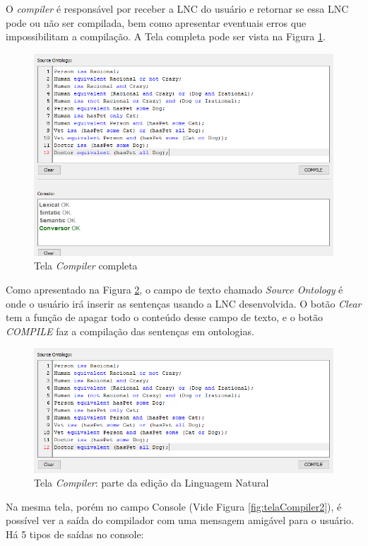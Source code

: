 \documentclass{bcc}
\begin{document}
O \textit{compiler} é responsável por receber a LNC do usuário e retornar se essa LNC pode ou não ser compilada, bem como apresentar eventuais erros que impossibilitam a compilação. A Tela completa pode ser vista na Figura \ref{fig:telaCompiler}.


\begin{figure}[H]
\centering
\includegraphics[width=.8\textwidth]{Figuras/tela_compiler.png}
\caption{Tela \textit{Compiler} completa}
\label{fig:telaCompiler}
\end{figure}

Como apresentado na Figura \ref{fig:telaCompiler1}, o campo de texto chamado \textit{Source Ontology} é onde o usuário irá inserir as sentenças usando a LNC desenvolvida. O botão \textit{Clear} tem a função de apagar todo o conteúdo desse campo de texto, e o botão \textit{COMPILE} faz a compilação das sentenças em ontologias.

\begin{figure}[H]
\centering
\includegraphics[width=.8\textwidth]{Figuras/tela_compiler1.png}
\caption{Tela \textit{Compiler}: parte da edição da Linguagem Natural}
\label{fig:telaCompiler1}
\end{figure}

Na mesma tela, porém no campo Console (Vide Figura \ref{fig:telaCompiler2}), é possível ver a saída do compilador com uma mensagem amigável para o usuário. Há 5 tipos de saídas no console: 
\end{document}
